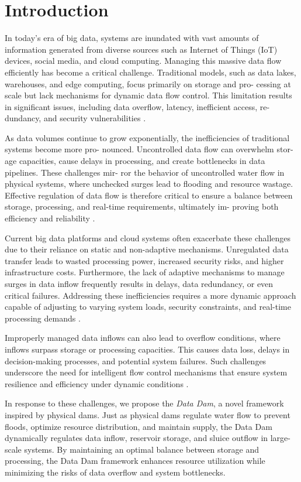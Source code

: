 \section{Introduction}

In today’s era of big data, systems are inundated with
vast amounts of information generated from diverse
sources such as Internet of Things (IoT) devices, social
media, and cloud computing. Managing this massive
data flow efficiently has become a critical challenge.
Traditional models, such as data lakes, warehouses, and
edge computing, focus primarily on storage and pro-
cessing at scale but lack mechanisms for dynamic data
flow control. This limitation results in significant issues,
including data overflow, latency, inefficient access, re-
dundancy, and security vulnerabilities
\cite{kumar2024ai}.

As data volumes continue to grow exponentially, the
inefficiencies of traditional systems become more pro-
nounced. Uncontrolled data flow can overwhelm stor-
age capacities, cause delays in processing, and create
bottlenecks in data pipelines. These challenges mir-
ror the behavior of uncontrolled water flow in physical
systems, where unchecked surges lead to flooding and
resource wastage. Effective regulation of data flow is
therefore critical to ensure a balance between storage,
processing, and real-time requirements, ultimately im-
proving both efficiency and reliability \cite{hashem2015rise}.

Current big data platforms and cloud systems often exacerbate these challenges due to their reliance on static and non-adaptive mechanisms. Unregulated data transfer leads to wasted processing power, increased security risks, and higher infrastructure costs. Furthermore, the lack of adaptive mechanisms to manage surges in data inflow frequently results in delays, data redundancy, or even critical failures. Addressing these inefficiencies requires a more dynamic approach capable of adjusting to varying system loads, security constraints, and real-time processing demands \cite{computers12110218}.

Improperly managed data inflows can also lead to overflow conditions, where inflows surpass storage or processing capacities. This causes data loss, delays in decision-making processes, and potential system failures. Such challenges underscore the need for intelligent flow control mechanisms that ensure system resilience and efficiency under dynamic conditions \cite{shobeiryai}.

In response to these challenges, we propose the \textit{Data Dam}, a novel framework inspired by physical dams. Just as physical dams regulate water flow to prevent floods, optimize resource distribution, and maintain supply, the Data Dam dynamically regulates data inflow, reservoir storage, and sluice outflow in large-scale systems. By maintaining an optimal balance between storage and processing, the Data Dam framework enhances resource utilization while minimizing the risks of data overflow and system bottlenecks.


